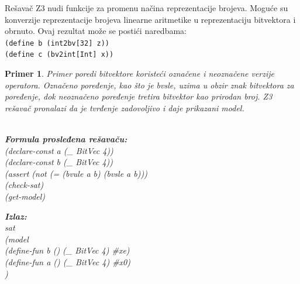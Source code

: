 \documentclass[12pt,oneside]{memoir}
\newcommand\tab[1][0.5cm]{\hspace*{#1}}
\newtheorem{primer}{Primer}
\begin{document}
Rešavač Z3 nudi funkcije za promenu načina reprezentacije brojeva. Moguće su konverzije reprezentacije brojeva linearne aritmetike u reprezentaciju bitvektora i obrnuto. Ovaj rezultat može se postići naredbama: \\
\texttt{(define b (int2bv[32] z))} \\  
\texttt{(define c (bv2int[Int] x))} 
\begin{primer} Primer poredi bitvektore koristeći označene i neoznačene verzije operatora. Označeno poređenje, kao što je bvsle, uzima u obzir znak bitvektora za poređenje, dok neoznačeno poređenje tretira bitvektor kao prirodan broj. Z3 rešavač pronalazi da je tvrđenje zadovoljivo i daje prikazani model.
\\ \\
\begin{minipage}[b]{0.5\textwidth}
\textbf{Formula prosleđena rešavaču:}
\\(declare-const a (\_ BitVec 4))
\\(declare-const b (\_ BitVec 4))
\\(assert (not (= (bvule a b) (bvsle a b)))
\\(check-sat)
\\(get-model)
\end{minipage}
\hspace{1.15cm} 
\begin{minipage}[t]{0.5\textwidth}
\vspace{-3.45cm}
\textbf{Izlaz:}
\\sat 
\\(model 
\\\tab(define-fun b () (\_ BitVec 4) \#xe) 
\\\tab(define-fun a () (\_ BitVec 4) \#x0)
\\)
\end{minipage}
\end{primer}
\end{document}
